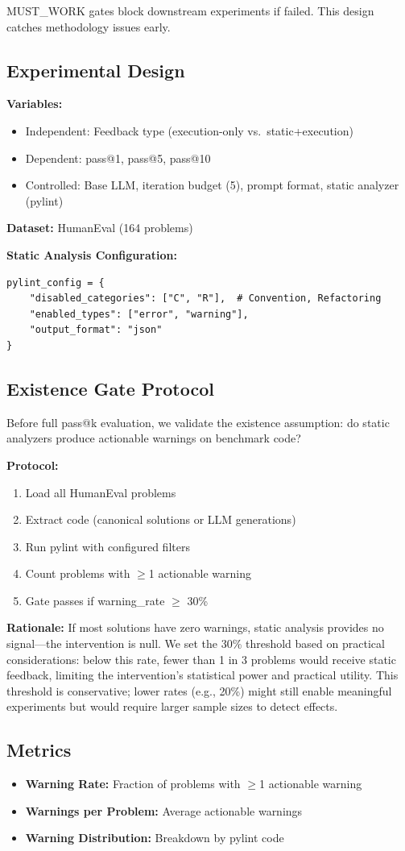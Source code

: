 MUST\_WORK gates block downstream experiments if failed. This design catches methodology issues early.

\subsection{Experimental Design}

\textbf{Variables:}
\begin{itemize}
    \item Independent: Feedback type (execution-only vs.\ static+execution)
    \item Dependent: pass@1, pass@5, pass@10
    \item Controlled: Base LLM, iteration budget (5), prompt format, static analyzer (pylint)
\end{itemize}

\textbf{Dataset:} HumanEval (164 problems)

\textbf{Static Analysis Configuration:}
\begin{verbatim}
pylint_config = {
    "disabled_categories": ["C", "R"],  # Convention, Refactoring
    "enabled_types": ["error", "warning"],
    "output_format": "json"
}
\end{verbatim}

\subsection{Existence Gate Protocol}

Before full pass@k evaluation, we validate the existence assumption: do static analyzers produce actionable warnings on benchmark code?

\textbf{Protocol:}
\begin{enumerate}
    \item Load all HumanEval problems
    \item Extract code (canonical solutions or LLM generations)
    \item Run pylint with configured filters
    \item Count problems with $\geq$1 actionable warning
    \item Gate passes if warning\_rate $\geq$ 30\%
\end{enumerate}

\textbf{Rationale:} If most solutions have zero warnings, static analysis provides no signal---the intervention is null. We set the 30\% threshold based on practical considerations: below this rate, fewer than 1 in 3 problems would receive static feedback, limiting the intervention's statistical power and practical utility. This threshold is conservative; lower rates (e.g., 20\%) might still enable meaningful experiments but would require larger sample sizes to detect effects.

\subsection{Metrics}

\begin{itemize}
    \item \textbf{Warning Rate:} Fraction of problems with $\geq$1 actionable warning
    \item \textbf{Warnings per Problem:} Average actionable warnings
    \item \textbf{Warning Distribution:} Breakdown by pylint code
\end{itemize}
